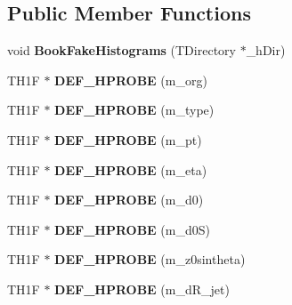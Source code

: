 \subsection*{Public Member Functions}
\begin{DoxyCompactItemize}
\item 
\hypertarget{classHistos__Fake_a0656561e3aaeed2986075f8b3935e084}{
void {\bfseries BookFakeHistograms} (TDirectory $\ast$\_\-hDir)}
\label{classHistos__Fake_a0656561e3aaeed2986075f8b3935e084}

\item 
\hypertarget{classHistos__Fake_a757e776a903c6f4f8472194682d4f3a5}{
TH1F $\ast$ {\bfseries DEF\_\-HPROBE} (m\_\-org)}
\label{classHistos__Fake_a757e776a903c6f4f8472194682d4f3a5}

\item 
\hypertarget{classHistos__Fake_ad12ead3103dfccbdcc3838665c54b314}{
TH1F $\ast$ {\bfseries DEF\_\-HPROBE} (m\_\-type)}
\label{classHistos__Fake_ad12ead3103dfccbdcc3838665c54b314}

\item 
\hypertarget{classHistos__Fake_a083980196a559361d9acda477775e568}{
TH1F $\ast$ {\bfseries DEF\_\-HPROBE} (m\_\-pt)}
\label{classHistos__Fake_a083980196a559361d9acda477775e568}

\item 
\hypertarget{classHistos__Fake_a82f441751f9ecc434ec43e23e6883385}{
TH1F $\ast$ {\bfseries DEF\_\-HPROBE} (m\_\-eta)}
\label{classHistos__Fake_a82f441751f9ecc434ec43e23e6883385}

\item 
\hypertarget{classHistos__Fake_ac5618093543addbb07899bff6ee11803}{
TH1F $\ast$ {\bfseries DEF\_\-HPROBE} (m\_\-d0)}
\label{classHistos__Fake_ac5618093543addbb07899bff6ee11803}

\item 
\hypertarget{classHistos__Fake_a85dd7bd5adef85b7fdc4af4b81cc8f5f}{
TH1F $\ast$ {\bfseries DEF\_\-HPROBE} (m\_\-d0S)}
\label{classHistos__Fake_a85dd7bd5adef85b7fdc4af4b81cc8f5f}

\item 
\hypertarget{classHistos__Fake_adf75b0fc7f708edaec04caafbac4bdb6}{
TH1F $\ast$ {\bfseries DEF\_\-HPROBE} (m\_\-z0sintheta)}
\label{classHistos__Fake_adf75b0fc7f708edaec04caafbac4bdb6}

\item 
\hypertarget{classHistos__Fake_a7f7a9d4b6a7e0eb154ca54b613ea7da3}{
TH1F $\ast$ {\bfseries DEF\_\-HPROBE} (m\_\-dR\_\-jet)}
\label{classHistos__Fake_a7f7a9d4b6a7e0eb154ca54b613ea7da3}


\end{DoxyCompactItemize}
